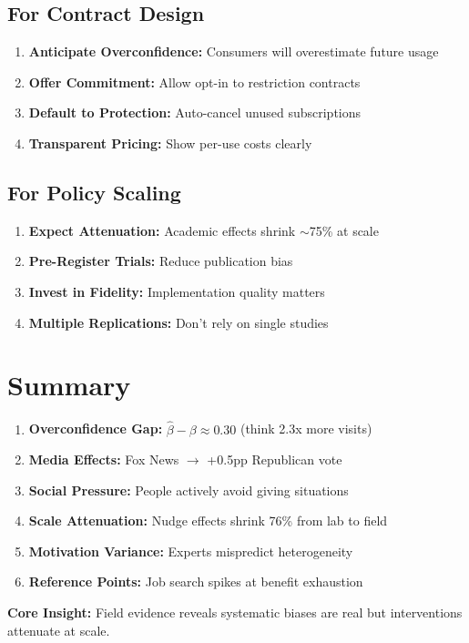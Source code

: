 \subsection{For Contract Design}

\begin{enumerate}
    \item \textbf{Anticipate Overconfidence:} Consumers will overestimate future usage
    \item \textbf{Offer Commitment:} Allow opt-in to restriction contracts
    \item \textbf{Default to Protection:} Auto-cancel unused subscriptions
    \item \textbf{Transparent Pricing:} Show per-use costs clearly
\end{enumerate}

\subsection{For Policy Scaling}

\begin{enumerate}
    \item \textbf{Expect Attenuation:} Academic effects shrink $\sim$75\% at scale
    \item \textbf{Pre-Register Trials:} Reduce publication bias
    \item \textbf{Invest in Fidelity:} Implementation quality matters
    \item \textbf{Multiple Replications:} Don't rely on single studies
\end{enumerate}

\section{Summary}

\begin{tcolorbox}[colback=gray!10!white,colframe=gray!50!black,title=Key Takeaways]
\begin{enumerate}
    \item \textbf{Overconfidence Gap:} $\hat{\beta} - \beta \approx 0.30$ (think 2.3x more visits)
    \item \textbf{Media Effects:} Fox News $\rightarrow$ +0.5pp Republican vote
    \item \textbf{Social Pressure:} People actively avoid giving situations
    \item \textbf{Scale Attenuation:} Nudge effects shrink 76\% from lab to field
    \item \textbf{Motivation Variance:} Experts mispredict heterogeneity
    \item \textbf{Reference Points:} Job search spikes at benefit exhaustion
\end{enumerate}

\textbf{Core Insight:} Field evidence reveals systematic biases are real but interventions attenuate at scale.
\end{tcolorbox}

